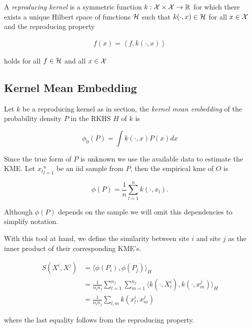 A {\it reproducing kernel} is a symmetric function $k: \mathcal{X}\times \mathcal{X}\rightarrow \mathbb{R}$ for which there exists a unique Hilbert space of functions $\mathcal{H}$ such that $k(\cdot,x)\in \mathcal{H}$ for all $x\in \mathcal{X}$ and the reproducing property

\begin{align}

f(x) = \left<f,k(\cdot,x)\right>

\end{align}

holds for all $f\in\mathcal{H}$ and all $x\in \mathcal{X}$

\subsection{Kernel Mean Embedding}

\label{kme}

Let $k$ be a reproducing kernel as in section, the {\it kernel mean embedding} of the probability density $P$ in the RKHS $H$ of $k$ is

$$\phi_0(P) = \int k(\cdot,x)P(x) dx$$

Since the true form of $P$ is unknown we use the available data to estimate the KME. Let ${x_l}_{l=1}^n$ be an iid sample from $P$, then the empirical kme of $O$ is

$$\phi(P)=\frac{1}{n}\sum_{l=1}^n k(\cdot,x_l).$$

Although $\phi(P)$ depends on the sample we will omit this dependencies to simplify notation.

With this tool at hand, we define the similarity between site $i$ and site $j$ as the inner product of their corresponding KME's.

\begin{align*}

S(X^i,X^j)&=\langle \phi(P_i),\phi(P_j) \rangle_H \\

&= \frac{1}{n_i n_j} \sum_{l=1}^{n_j} \sum_{m=1}^{n_j} \langle k(\cdot,X_l^i),k(\cdot,x_m^j) \rangle_H \\

&= \frac{1}{n_i n_j} \sum_{l,m} k(x^i_l,x^j_m)

\end{align*}

where the last equality follows from the reproducing property.
